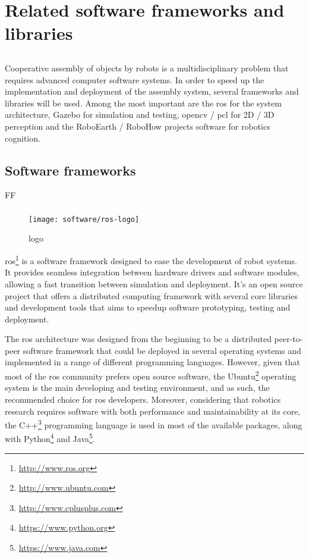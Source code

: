 \chapter{Related software frameworks and libraries}\label{chap:related-software-frameworks-and-libraries}

\section*{}

Cooperative assembly of objects by robots is a multidisciplinary problem that requires advanced computer software systems. In order to speed up the implementation and deployment of the assembly system, several frameworks and libraries will be used. Among the most important are the \gls{ros} for the system architecture, Gazebo for simulation and testing, \gls{opencv} / \gls{pcl} for 2D / 3D perception and the RoboEarth / RoboHow projects software for robotics cognition.




\section{Software frameworks}

FF

\subsection{}

\begin{wrapfigure}{r}{0.23\textwidth}
	\centering
	\vspace*{-2em}
	\texttt{[image: software/ros-logo]}
	\caption{ logo}
	\label{fig:ros-logo}
\end{wrapfigure}

\gls{ros}\footnote{\url{http://www.ros.org}} \cite{Quigley2009} is a software framework designed to ease the development of robot systems. It provides seamless integration between hardware drivers and software modules, allowing a fast transition between simulation and deployment. It's an open source project that offers a distributed computing framework with several core libraries and development tools that aims to speedup software prototyping, testing and deployment.

The \gls{ros} architecture was designed from the beginning to be a distributed peer-to-peer software framework that could be deployed in several operating systems and implemented in a range of different programming languages. However, given that most of the \gls{ros} community prefers open source software, the Ubuntu\footnote{\url{http://www.ubuntu.com}} operating system is the main developing and testing environment, and as such, the recommended choice for \gls{ros} developers. Moreover, considering that robotics research requires software with both performance and maintainability at its core, the C++\footnote{\url{http://www.cplusplus.com}} programming language is used in most of the available packages, along with Python\footnote{\url{https://www.python.org}} and Java\footnote{\url{https://www.java.com}}.


